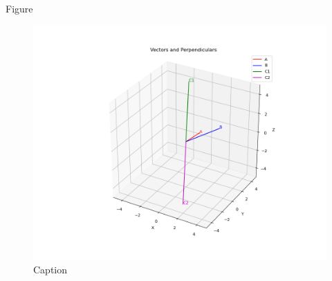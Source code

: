\documentclass{beamer}
\begin{document}
\begin{frame}{Figure}
    \begin{figure}
        \centering
        \includegraphics[width=\columnwidth]{figs/vector_plot.png}
        \caption{Caption}
        \label{fig:placeholder}
    \end{figure}
\end{frame}
\end{document}
